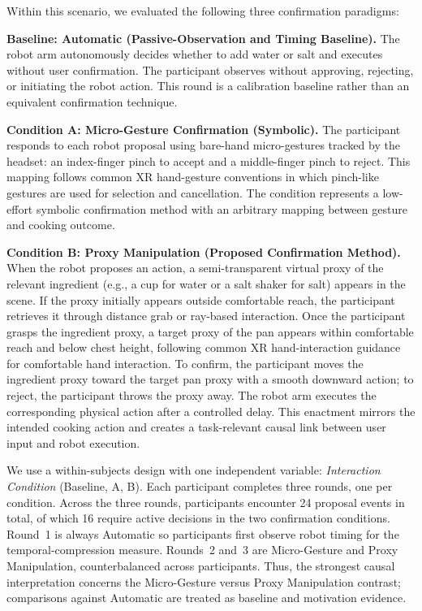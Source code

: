 \documentclass[sigconf,review,anonymous]{acmart}
\begin{document}
Within this scenario, we evaluated the following three confirmation paradigms:

\textbf{Baseline: Automatic (Passive-Observation and Timing Baseline).} The robot arm autonomously decides whether to add water or salt and executes without user confirmation. The participant observes without approving, rejecting, or initiating the robot action. This round is a calibration baseline rather than an equivalent confirmation technique.
    
	\textbf{Condition A: Micro-Gesture Confirmation (Symbolic).} The participant responds to each robot proposal using bare-hand micro-gestures tracked by the headset: an index-finger pinch to accept and a middle-finger pinch to reject. This mapping follows common XR hand-gesture conventions in which pinch-like gestures are used for selection and cancellation. The condition represents a low-effort symbolic confirmation method with an arbitrary mapping between gesture and cooking outcome.
    
	\textbf{Condition B: Proxy Manipulation (Proposed Confirmation Method).} When the robot proposes an action, a semi-transparent virtual proxy of the relevant ingredient (e.g., a cup for water or a salt shaker for salt) appears in the scene. If the proxy initially appears outside comfortable reach, the participant retrieves it through distance grab or ray-based interaction. Once the participant grasps the ingredient proxy, a target proxy of the pan appears within comfortable reach and below chest height, following common XR hand-interaction guidance for comfortable hand interaction. To confirm, the participant moves the ingredient proxy toward the target pan proxy with a smooth downward action; to reject, the participant throws the proxy away. The robot arm executes the corresponding physical action after a controlled delay. This enactment mirrors the intended cooking action and creates a task-relevant causal link between user input and robot execution.

We use a within-subjects design with one independent variable: \textit{Interaction Condition} (Baseline, A, B). Each participant completes three rounds, one per condition. Across the three rounds, participants encounter 24 proposal events in total, of which 16 require active decisions in the two confirmation conditions. Round~1 is always Automatic so participants first observe robot timing for the temporal-compression measure. Rounds~2 and~3 are Micro-Gesture and Proxy Manipulation, counterbalanced across participants. Thus, the strongest causal interpretation concerns the Micro-Gesture versus Proxy Manipulation contrast; comparisons against Automatic are treated as baseline and motivation evidence.
\end{document}
